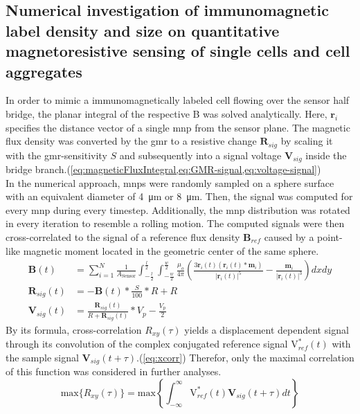 \subsection{Numerical investigation of immunomagnetic label density and size on quantitative magnetoresistive sensing of single cells and cell aggregates}
In order to mimic a immunomagnetically labeled cell flowing over the sensor half bridge, the planar integral of the respective \acrfull{B} was solved analytically. Here, $\mathbf{r}_i$ specifies the distance vector of a single \gls{mnp} from the sensor plane. The magnetic flux density was converted by the \gls{gmr} to a resistive change $\mathbf{R}_{sig}$ by scaling it with the \gls{gmr}-sensitivity $S$ and subsequently into a signal voltage $\mathbf{V}_{sig}$ inside the bridge branch.(\cref{eq:magneticFluxIntegral,eq:GMR-signal,eq:voltage-signal})\\
In the numerical approach, \glspl{mnp} were randomly sampled on a sphere surface with an equivalent diameter of \SI{4}{\micro\meter} or \SI{8}{\micro\meter}. Then, the signal was computed for every \gls{mnp} during every timestep. Additionally, the \gls{mnp} distribution was rotated in every iteration to resemble a rolling motion. The computed signals were then cross-correlated to the signal of a reference flux density $\mathbf{B}_{ref}$ caused by a point-like magnetic moment located in the geometric center of the same sphere.
\begin{align}
	\mathbf{B}(t) &= \sum_{i=1}^{N} \frac{1}{A_{\mathrm{Sensor}}} \int_{-\frac{l}{2}}^{\frac{l}{2}} \int_{-\frac{w}{2}}^{\frac{w}{2}} \frac{\mu_{o}}{4 \pi}\left(\frac{3 \mathbf{r}_{i}(t)\left(\mathbf{r}_{i}(t) * \mathbf{m}_{i}\right)}{\left|\mathbf{r}_{i}(t)\right|^{5}}-\frac{\mathbf{m}_{i}}{\left|\mathbf{r}_{i}(t)\right|^{3}}\right) dx dy \label{eq:magneticFluxIntegral} \\
	\mathbf{R}_{sig}(t) &= - \mathbf{B}(t) * \frac{S}{100} * R + R \label{eq:GMR-signal}\\
	\mathbf{V}_{sig}(t) &= \frac{\mathbf{R}_{sig}(t)}{R + \mathbf{R}_{sig}(t)}*V_p - \frac{V_p}{2} \label{eq:voltage-signal}
\end{align}
By its formula, cross-correlation $R_{x y}(\tau)$ yields a displacement dependent signal through its convolution of the complex conjugated reference signal $\mathrm{V}_{ref}^{*}(t)$ with the sample signal $\mathbf{V}_{sig}(t+\tau)$.(\cref{eq:xcorr}) Therefor, only the maximal correlation of this function was considered in further analyses.
\begin{equation}
	\mathrm{max}\{R_{x y}(\tau)\}=\mathrm{max}\left\{\int_{-\infty}^{\infty} \mathrm{V}_{ref}^{*}(t) \mathbf{V}_{sig}(t+\tau) dt \right\} \label{eq:xcorr}
\end{equation}
